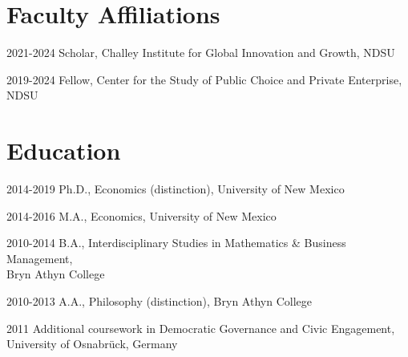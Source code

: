 \documentclass[12pt,letterpaper]{report}
\begin{document}
        \section*{Faculty Affiliations}
    \begin{tablist}
         \item[2021-2024] \tab  Scholar, Challey Institute for Global Innovation and Growth, NDSU %
         \item[2019-2024]  \tab Fellow, Center for the Study of Public Choice and Private Enterprise, NDSU

    \end{tablist}


       \section*{Education}

    \begin{tablist}

        \item[2014-2019] \tab Ph.D., Economics (distinction), University of New Mexico
        \item[2014-2016]  \tab M.A., Economics, University of New Mexico
        \item[2010-2014]  \tab B.A., Interdisciplinary Studies in Mathematics \& Business Management, \\ \tab Bryn Athyn College
         \item[2010-2013]  \tab A.A., Philosophy (distinction), Bryn Athyn College
         \item[2011\hphantom{-2014}] \tab Additional coursework in Democratic Governance and Civic Engagement, \\ \tab University of Osnabr\"{u}ck, Germany

    \end{tablist}


\end{document}

